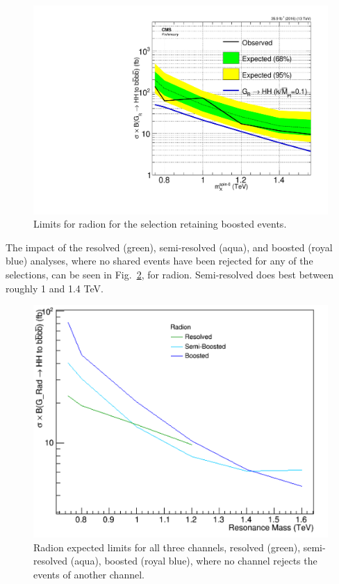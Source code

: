 \begin{figure}[thb!]
\begin{center}
\includegraphics[scale=0.5]{F5/brazilianFlag_Rad_2p1boostres_HH4b2p1_HH4b2p1_13TeV.pdf}
\end{center}
\caption{Limits for radion for the selection retaining boosted events.}
\label{fig:radblindnone}
\end{figure} 

The impact of the resolved (green), semi-resolved (aqua), and boosted (royal blue) analyses, where no shared events have been rejected for any of the selections, can be seen in Fig.~\ref{fig:limcompare2}, for radion. Semi-resolved does best between roughly 1 and 1.4 TeV.
\begin{figure}
\centering
\includegraphics[scale=0.5]{F5/radion_compare.pdf}
\caption{Radion expected limits for all three channels, resolved (green), semi-resolved (aqua), boosted (royal blue), where no channel rejects the events of another channel.}
\label{fig:limcompare2}
\end{figure}

